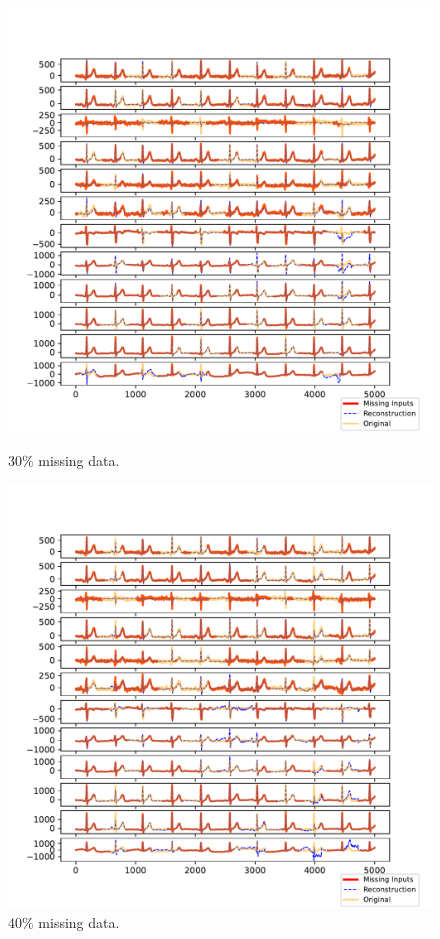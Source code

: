\documentclass{mldsmsc}
\begin{document}
\begin{figure}[H]
\begin{minipage}{0.4\linewidth}
    \includegraphics[width=\linewidth]{images/missing/psmf_output_30_3.pdf}
    \caption{$30\%$ missing data.}
\end{minipage}

\vspace{1em} %

\begin{minipage}{0.4\linewidth}
    \centering
    \includegraphics[width=\linewidth]{images/missing/psmf_output_40_3.pdf}
    \caption{$40\%$ missing data.}
\end{minipage}
\end{figure}
\end{document}
